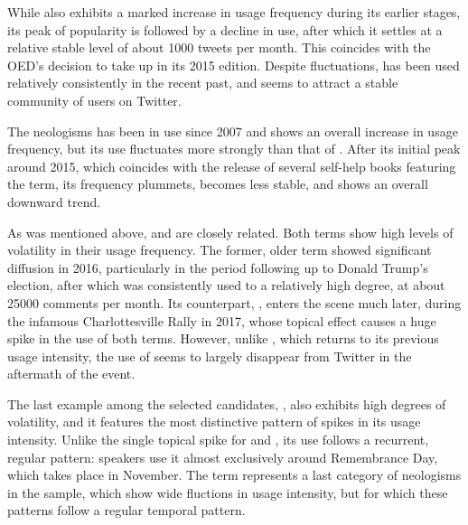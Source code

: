 \documentclass[
  a4paper,
  abstract=on,
  captions=tableabove
  ]{scrartcl}
\begin{document}
         While  also exhibits a marked increase in usage frequency during its earlier stages, its peak of popularity is followed by a decline in use, after which it settles at a relative stable level of about \num{1000} tweets per month. This coincides with the OED's decision to take up  in its 2015 edition. Despite fluctuations,  has been used relatively consistently in the recent past, and seems to attract a stable community of users on Twitter.

         The neologisms  has been in use since 2007 and shows an overall increase in usage frequency, but its use fluctuates more strongly than that of . After its initial peak around 2015, which coincides with the release of several self-help books featuring the term, its frequency plummets, becomes less stable, and shows an overall downward trend.

         As was mentioned above,  and  are closely related. Both terms show high levels of volatility in their usage frequency. The former, older term showed significant diffusion in 2016, particularly in the period following up to Donald Trump's election, after which  was consistently used to a relatively high degree, at about \num{25000} comments per month. Its counterpart, , enters the scene much later, during the infamous Charlottesville Rally in 2017, whose topical effect causes a huge spike in the use of both terms. However, unlike , which returns to its previous usage intensity, the use of  seems to largely disappear from Twitter in the aftermath of the event.

         The last example among the selected candidates, , also exhibits high degrees of volatility, and it features the most distinctive pattern of spikes in its usage intensity. Unlike the single topical spike for  and , its use follows a recurrent, regular pattern: speakers use it almost exclusively around Remembrance Day, which takes place in November. The term  represents a last category of neologisms in the sample, which show wide fluctions in usage intensity, but for which these patterns follow a regular temporal pattern. 
\end{document}
